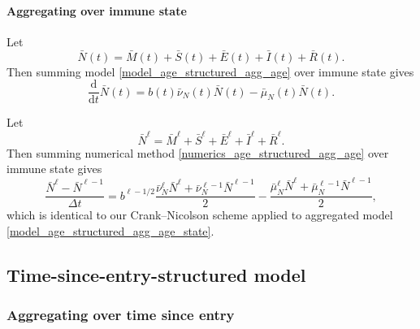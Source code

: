 \documentclass[USenglish]{article}
\newcommand{\md}{\mathrm{d}}
\begin{document}
\paragraph{Aggregating over immune state}

Let
\begin{equation}
  \bar{N}(t)
  = \bar{M}(t) + \bar{S}(t) + \bar{E}(t) + \bar{I}(t) + \bar{R}(t).
\end{equation}
Then summing model \eqref{model_age_structured_agg_age} over immune
state gives
\begin{equation}
  \label{model_age_structured_agg_age_state}
  \frac{\md}{\md t} \bar{N}(t)
  = b(t) \bar{\nu}_N(t) \bar{N}(t)
  - \bar{\mu}_N(t) \bar{N}(t).
\end{equation}


Let
\begin{equation}
  \bar{N}^{\ell}
  = \bar{M}^{\ell} + \bar{S}^{\ell} + \bar{E}^{\ell}
 + \bar{I}^{\ell} + \bar{R}^{\ell}.
\end{equation}
Then summing numerical method
\eqref{numerics_age_structured_agg_age} over immune state gives
\begin{equation}
  \label{numerics_age_structured_agg_age_state}
  \frac{\bar{N}^{\ell} - \bar{N}^{\ell - 1}}{\Delta t}
  = b^{\ell - 1 / 2}
  \frac{\bar{\nu}_N^{\ell} \bar{N}^{\ell}
  + \bar{\nu}_N^{\ell - 1} \bar{N}^{\ell - 1}}{2}
  - \frac{\bar{\mu}_N^{\ell} \bar{N}^{\ell}
  + \bar{\mu}_N^{\ell - 1} \bar{N}^{\ell - 1}}{2},
\end{equation}
which is identical to our Crank--Nicolson scheme applied to aggregated
model \eqref{model_age_structured_agg_age_state}.


\subsection{Time-since-entry-structured model}


\subsubsection{Aggregating over time since entry}
\end{document}
